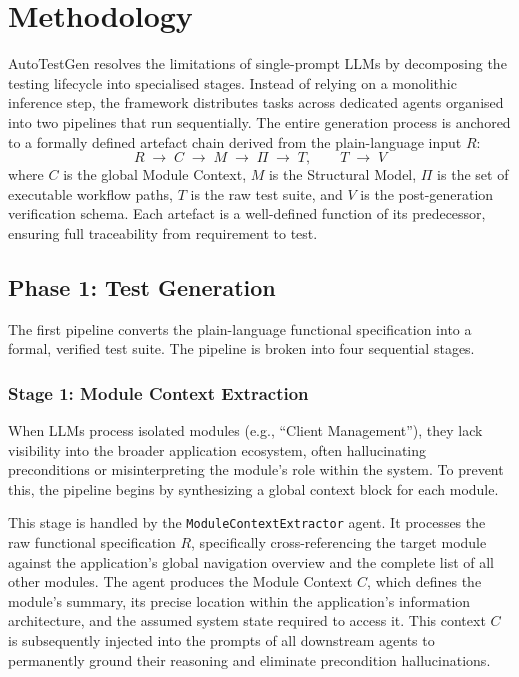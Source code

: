 
\section{Methodology}

AutoTestGen resolves the limitations of single-prompt LLMs by decomposing the testing lifecycle into specialised stages. Instead of relying on a monolithic inference step, the framework distributes tasks across dedicated agents organised into two pipelines that run sequentially. The entire generation process is anchored to a formally defined artefact chain derived from the plain-language input $R$:
%
\[
  R \;\longrightarrow\; C \;\longrightarrow\; M \;\longrightarrow\; \Pi \;\longrightarrow\; T, \qquad T \;\longrightarrow\; V
\]
%
where $C$ is the global Module Context, $M$ is the Structural Model, $\Pi$ is the set of executable workflow paths, $T$ is the raw test suite, and $V$ is the post-generation verification schema. Each artefact is a well-defined function of its predecessor, ensuring full traceability from requirement to test.

\subsection{Phase 1: Test Generation}

The first pipeline converts the plain-language functional specification into a formal, verified test suite. The pipeline is broken into four sequential stages.

\subsubsection{Stage 1: Module Context Extraction}

When LLMs process isolated modules (e.g., ``Client Management''), they lack visibility into the broader application ecosystem, often hallucinating preconditions or misinterpreting the module's role within the system. To prevent this, the pipeline begins by synthesizing a global context block for each module.

This stage is handled by the \texttt{ModuleContextExtractor} agent. It processes the raw functional specification $R$, specifically cross-referencing the target module against the application's global navigation overview and the complete list of all other modules. The agent produces the Module Context $C$, which defines the module's summary, its precise location within the application's information architecture, and the assumed system state required to access it. This context $C$ is subsequently injected into the prompts of all downstream agents to permanently ground their reasoning and eliminate precondition hallucinations.

